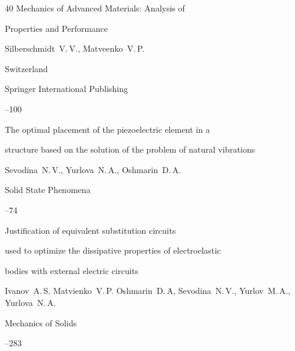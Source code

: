 \begin{thebibliography}{40}
\inbook Mechanics of Advanced Materials: Analysis of

Properties and Performance

\eds Silberschmidt~V.\,V., Matveenko~V.\,P.

\publaddr Switzerland

\publ Springer International Publishing


--100





\paper The optimal placement of the piezoelectric element in a

structure based on the solution of the problem of natural vibrations

\by Sevodina~N.\,V., Yurlova~N.\,A., Oshmarin~D.\,A.

\jour Solid State Phenomena



--74





\paper Justification of equivalent substitution circuits

used to optimize the dissipative properties of electroelastic

bodies with external electric circuits

\by Ivanov~A.\,S. Matvienko~V.\,P. Oshmarin~D.\,A, Sevodina~N.\,V., Yurlov~M.\,A., Yurlova~N.\,A.

\jour Mechanics of Solids




--283




\end{thebibliography}



\EngDate









 















